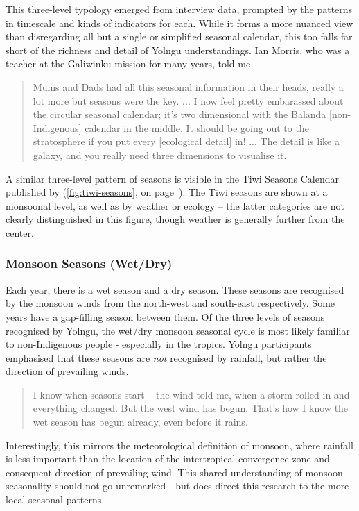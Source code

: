 This three-level typology emerged from interview data, prompted by
the patterns in timescale and kinds of indicators for each.
While it forms a more nuanced view than disregarding all but a single or
simplified seasonal calendar, this too falls far short of the richness
and detail of Yolngu understandings.
%
Ian Morris, who was a teacher at the Galiwinku mission for many years, told me
\begin{quote}
    Mums and Dads had all this seasonal information in their heads, really
    a lot more but seasons were the key. ...  I now feel pretty embarassed
    about the circular seasonal calendar; it's two dimensional with the Balanda
    [non-Indigenous] calendar in the middle.  It should be going out to the
    stratosphere if you put every [ecological detail] in! ... The detail is
    like a galaxy, and you really need three dimensions to visualise it.
\end{quote}

A similar three-level pattern of seasons is visible in the Tiwi Seasons Calendar
published by \citet{CSIROcals} (\cref{fig:tiwi-seasons}, on
page~\pageref{fig:tiwi-seasons}).  The Tiwi seasons are shown at a monsoonal
level, as well as by weather or ecology -- the latter categories are not clearly
distinguished in this figure, though weather is generally further from the center.


\subsubsection{Monsoon Seasons (Wet/Dry)}

Each year, there is a wet season and a dry season.  These seasons are
recognised by the monsoon winds from the north-west and south-east
respectively.  Some years have a gap-filling season between them.
%
Of the three levels of seasons recognised by Yolngu, the wet/dry monsoon
seasonal cycle is most likely familiar to non-Indigenous people - especially
in the tropics.  Yolngu participants emphasised that these seasons are
\emph{not} recognised by rainfall, but rather the direction of prevailing winds.
\begin{quote}
    I know when seasons start -- the wind told me, when a storm rolled in
    and everything changed.  But the west wind has begun.  That's how I
    know the wet season has begun already, even before it rains.
\end{quote}

Interestingly, this mirrors the meteorological definition of monsoon,
where rainfall is less important than the location of the intertropical
convergence zone and consequent direction of prevailing wind.
This shared understanding of monsoon seasonality should not go unremarked -
but does direct this research to the more local seasonal patterns.


